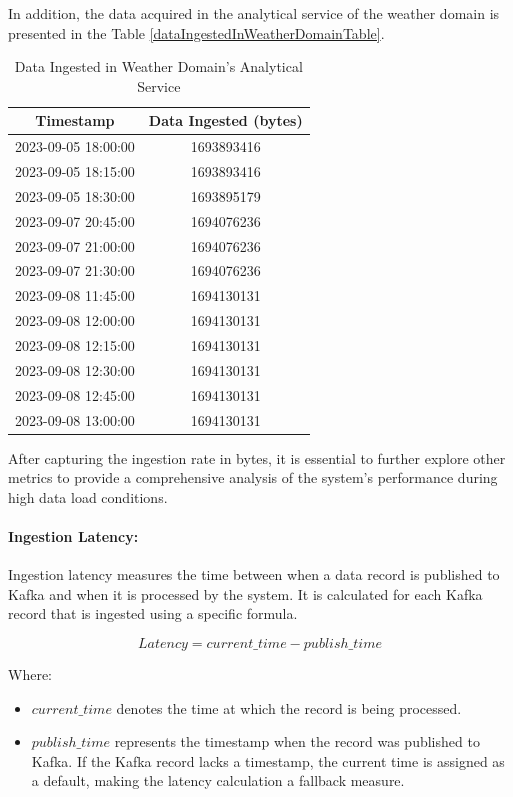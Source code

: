 \documentclass[journal]{IEEEtran}
\begin{document}
In addition, the data acquired in the analytical service of the weather domain is presented in the Table \ref{dataIngestedInWeatherDomainTable}.

\begin{table}[ht]
  \centering
  \caption{Data Ingested in Weather Domain's Analytical Service}
  \begin{tabular}{|c|c|}
  \hline
  \textbf{Timestamp} & \textbf{Data Ingested (bytes)} \\
  \hline
  2023-09-05 18:00:00 & 1693893416 \\
  2023-09-05 18:15:00 & 1693893416 \\
  2023-09-05 18:30:00 & 1693895179 \\
  2023-09-07 20:45:00 & 1694076236 \\
  2023-09-07 21:00:00 & 1694076236 \\
  2023-09-07 21:30:00 & 1694076236 \\
  2023-09-08 11:45:00 & 1694130131 \\
  2023-09-08 12:00:00 & 1694130131 \\
  2023-09-08 12:15:00 & 1694130131 \\
  2023-09-08 12:30:00 & 1694130131 \\
  2023-09-08 12:45:00 & 1694130131 \\
  2023-09-08 13:00:00 & 1694130131 \\
  \hline
  \end{tabular}
  \label{dataIngestedInWeatherDomainAnalyticalServiceTable}
\end{table}

After capturing the ingestion rate in bytes, it is essential to further explore other metrics to provide a comprehensive analysis of the system's performance during high data load conditions.


\paragraph{Ingestion Latency:}

Ingestion latency measures the time between when a data record is published to Kafka and when it is processed by the system. It is calculated for each Kafka record that is ingested using a specific formula.

\[ Latency = current\_time - publish\_time \] 

Where:
\begin{itemize}
    \item \(current\_time\) denotes the time at which the record is being processed.
    \item \(publish\_time\) represents the timestamp when the record was published to Kafka. If the Kafka record lacks a timestamp, the current time is assigned as a default, making the latency calculation a fallback measure.
\end{itemize}
\end{document}

